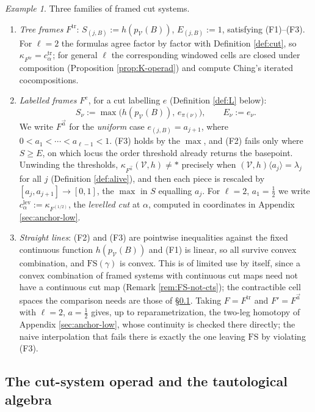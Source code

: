 \documentclass[12pt]{amsart}
\theoremstyle{definition}
\theoremstyle{remark}
\newtheorem{example}[subsection]{Example}
\newcommand{\Cal}[1]{\mathcal{#1}}
\newcommand{\alive}[2]{#1\langle #2\rangle}      %
\newcommand{\basept}{\ast}
\begin{document}
\begin{example}\label{ex:frames}
Three families of framed cut systems.
\begin{enumerate}[label=(\arabic*)]
    \item \emph{Tree frames} $F^{\mathrm{tr}}$: $S_{(j,B)} := h(p_{\Cal{V}}(B))$, $E_{(j,B)} := 1$, satisfying (F1)--(F3). For $\ell = 2$ the formulas agree factor by factor with Definition \ref{def:cut}, so $\kappa_{F^{\mathrm{tr}}} = c^{\mathrm{tr}}_{\alpha}$; for general $\ell$ the corresponding windowed cells are closed under composition (Proposition \ref{prop:K-operad}) and compute Ching's iterated cocompositions.
    \item \emph{Labelled frames} $F^{e}$, for a cut labelling $e$ (Definition \ref{def:L} below):
    \[ S_\nu := \max\big(h(p_{\Cal{V}}(B)),\, e_{\pi(\nu)}\big), \quad\quad E_\nu := e_\nu.\]
    We write $F^{\vec a}$ for the \emph{uniform} case $e_{(j,B)} = a_{j+1}$, where $0 < a_1 < \cdots < a_{\ell-1} < 1$. (F3) holds by the $\max$, and (F2) fails only where $S\geq E$, on which locus the order threshold already returns the basepoint. Unwinding the thresholds, $\kappa_{F^{\vec a}}(\Cal{V},h)\neq \basept$ precisely when $\alive{(\Cal{V},h)}{a_{j}} = \lambda_j$ for all $j$ (Definition \ref{def:alive}), and then each piece is rescaled by $[a_j, a_{j+1}]\to[0,1]$, the $\max$ in $S$ equalling $a_j$. For $\ell = 2$, $a_1 = \tfrac12$ we write $c^{\mathrm{lev}}_{\alpha} := \kappa_{F^{(1/2)}}$, the \emph{levelled cut} at $\alpha$, computed in coordinates in Appendix \ref{sec:anchor-low}.
    \item \emph{Straight lines}: (F2) and (F3) are pointwise inequalities against the fixed continuous function $h(p_{\Cal{V}}(B))$ and (F1) is linear, so all survive convex combination, and $\mathrm{FS}(\gamma)$ is convex. This is of limited use by itself, since a convex combination of framed systems with continuous cut maps need not have a continuous cut map (Remark \ref{rem:FS-not-cts}); the contractible cell spaces the comparison needs are those of \S\ref{sec:K-and-L}. Taking $F = F^{\mathrm{tr}}$ and $F' = F^{\vec a}$ with $\ell = 2$, $a = \tfrac12$ gives, up to reparametrization, the two-leg homotopy of Appendix \ref{sec:anchor-low}, whose continuity is checked there directly; the naive interpolation that fails there is exactly the one leaving $\mathrm{FS}$ by violating (F3).
\end{enumerate}
\end{example}

\subsection{The cut-system operad and the tautological algebra}\label{sec:K-and-L}
\end{document}
